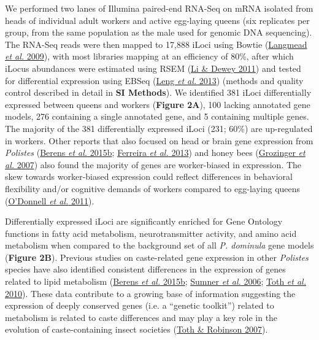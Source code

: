 \documentclass[]{article}
\begin{document}
We performed two lanes of Illumina paired-end RNA-Seq on mRNA isolated
from heads of individual adult workers and active egg-laying queens (six
replicates per group, from the same population as the male used for
genomic DNA sequencing). The RNA-Seq reads were then mapped to 17,888
iLoci using Bowtie (\protect\hyperlink{ux5fENREFux5f29}{Langmead
\emph{et al.} 2009}), with most libraries mapping at an efficiency of
80\%, after which iLocus abundances were estimated using RSEM
(\protect\hyperlink{ux5fENREFux5f31}{Li \& Dewey 2011}) and tested for
differential expression using EBSeq
(\protect\hyperlink{ux5fENREFux5f30}{Leng \emph{et al.} 2013}) (methods
and quality control described in detail in \textbf{SI Methods}). We
identified 381 iLoci differentially expressed between queens and workers
(\textbf{Figure 2A}), 100 lacking annotated gene models, 276 containing
a single annotated gene, and 5 containing multiple genes. The majority
of the 381 differentially expressed iLoci (231; 60\%) are up-regulated
in workers. Other reports that also focused on head or brain gene
expression from \emph{Polistes}
(\protect\hyperlink{ux5fENREFux5f3}{Berens \emph{et al.} 2015b};
\protect\hyperlink{ux5fENREFux5f10}{Ferreira \emph{et al.} 2013}) and
honey bees (\protect\hyperlink{ux5fENREFux5f16}{Grozinger \emph{et al.}
2007}) also found the majority of genes are worker-biased in expression.
The skew towards worker-biased expression could reflect differences in
behavioral flexibility and/or cognitive demands of workers compared to
egg-laying queens (\protect\hyperlink{ux5fENREFux5f38}{O'Donnell
\emph{et al.} 2011}).

Differentially expressed iLoci are significantly enriched for Gene
Ontology functions in fatty acid metabolism, neurotransmitter activity,
and amino acid metabolism when compared to the background set of all
\emph{P. dominula} gene models (\textbf{Figure 2B}). Previous studies on
caste-related gene expression in other \emph{Polistes} species have also
identified consistent differences in the expression of genes related to
lipid metabolism (\protect\hyperlink{ux5fENREFux5f3}{Berens \emph{et
al.} 2015b}; \protect\hyperlink{ux5fENREFux5f59}{Sumner \emph{et al.}
2006}; \protect\hyperlink{ux5fENREFux5f62}{Toth \emph{et al.} 2010}).
These data contribute to a growing base of information suggesting the
expression of deeply conserved genes (i.e. a ``genetic toolkit'')
related to metabolism is related to caste differences and may play a key
role in the evolution of caste-containing insect societies
(\protect\hyperlink{ux5fENREFux5f61}{Toth \& Robinson 2007}).
\end{document}

